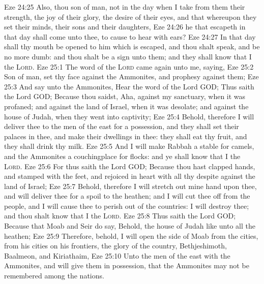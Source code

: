 \vs Eze 24:25 Also, thou son of man,  not  in the day when I take from them their strength, the joy of their glory, the desire of their eyes, and that whereupon they set their minds, their sons and their daughters,
\vs Eze 24:26  he that escapeth in that day shall come unto thee, to cause  to hear  with  ears?
\vs Eze 24:27 In that day shall thy mouth be opened to him which is escaped, and thou shalt speak, and be no more dumb: and thou shalt be a sign unto them; and they shall know that I  the \textsc{Lord}.
\vs Eze 25:1 The word of the \textsc{Lord} came again unto me, saying,
\vs Eze 25:2 Son of man, set thy face against the Ammonites, and prophesy against them;
\vs Eze 25:3 And say unto the Ammonites, Hear the word of the Lord GOD; Thus saith the Lord GOD; Because thou saidst, Aha, against my sanctuary, when it was profaned; and against the land of Israel, when it was desolate; and against the house of Judah, when they went into captivity;
\vs Eze 25:4 Behold, therefore I will deliver thee to the men of the east for a possession, and they shall set their palaces in thee, and make their dwellings in thee: they shall eat thy fruit, and they shall drink thy milk.
\vs Eze 25:5 And I will make Rabbah a stable for camels, and the Ammonites a couchingplace for flocks: and ye shall know that I  the \textsc{Lord}.
\vs Eze 25:6 For thus saith the Lord GOD; Because thou hast clapped  hands, and stamped with the feet, and rejoiced in heart with all thy despite against the land of Israel;
\vs Eze 25:7 Behold, therefore I will stretch out mine hand upon thee, and will deliver thee for a spoil to the heathen; and I will cut thee off from the people, and I will cause thee to perish out of the countries: I will destroy thee; and thou shalt know that I  the \textsc{Lord}.
\vs Eze 25:8 Thus saith the Lord GOD; Because that Moab and Seir do say, Behold, the house of Judah  like unto all the heathen;
\vs Eze 25:9 Therefore, behold, I will open the side of Moab from the cities, from his cities  on his frontiers, the glory of the country, Bethjeshimoth, Baalmeon, and Kiriathaim,
\vs Eze 25:10 Unto the men of the east with the Ammonites, and will give them in possession, that the Ammonites may not be remembered among the nations.

